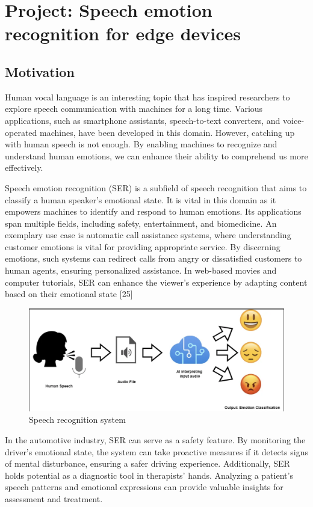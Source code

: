 \section{Project: Speech emotion recognition for edge devices}
\subsection{Motivation}
Human vocal language is an interesting topic that has inspired researchers to explore speech communication with machines for a long time. Various applications, such as smartphone assistants, speech-to-text converters, and voice-operated machines, have been developed in this domain.
However, catching up with human speech is not enough. By enabling machines to recognize and understand human emotions, we can enhance their ability to comprehend us more effectively.

Speech emotion recognition (SER) is a subfield of speech recognition that aims to classify a human speaker's emotional state. It is vital in this domain as it empowers machines to identify and respond to human emotions. Its applications span multiple fields, including safety, entertainment, and biomedicine. 
An exemplary use case is automatic call assistance systems, where understanding customer emotions is vital for providing appropriate service. By discerning emotions, such systems can redirect calls from angry or dissatisfied customers to human agents, ensuring personalized assistance.
In web-based movies and computer tutorials, SER can enhance the viewer's experience by adapting content based on their emotional state [25]

\begin{center}
    \begin{figure}[!htp]
        \centering
        \includegraphics[width=0.8 \textwidth]{image/speech_recognition}
        \caption{Speech recognition system}
        \label{subsection}
    \end{figure}
    \end{center}

In the automotive industry, SER can serve as a safety feature. By monitoring the driver's emotional state, the system can take proactive measures if it detects signs of mental disturbance, ensuring a safer driving experience. 
Additionally, SER holds potential as a diagnostic tool in therapists' hands. Analyzing a patient's speech patterns and emotional expressions can provide valuable insights for assessment and treatment.

